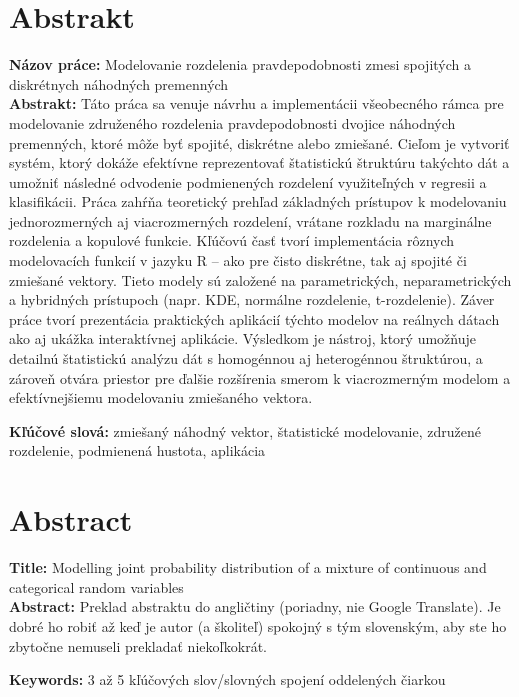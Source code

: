 
\section*{Abstrakt}

\noindent \textbf{Názov práce:} Modelovanie rozdelenia pravdepodobnosti zmesi spojitých a diskrétnych náhodných premenných\\
\textbf{Abstrakt:} Táto práca sa venuje návrhu a implementácii všeobecného rámca pre modelovanie združeného rozdelenia pravdepodobnosti dvojice náhodných premenných, ktoré môže byť spojité, diskrétne alebo zmiešané. Cieľom je vytvoriť systém, ktorý dokáže efektívne reprezentovať štatistickú štruktúru takýchto dát a umožniť následné odvodenie podmienených rozdelení využiteľných v regresii a klasifikácii. Práca zahŕňa teoretický prehľad základných prístupov k modelovaniu jednorozmerných aj viacrozmerných rozdelení, vrátane rozkladu na marginálne rozdelenia a kopulové funkcie. Kľúčovú časť tvorí implementácia rôznych modelovacích funkcií v jazyku R – ako pre čisto diskrétne, tak aj spojité či zmiešané vektory. Tieto modely sú založené na parametrických, neparametrických a hybridných prístupoch (napr. KDE, normálne rozdelenie, t-rozdelenie). Záver práce tvorí prezentácia praktických aplikácií týchto modelov na reálnych dátach ako aj ukážka interaktívnej aplikácie. Výsledkom je nástroj, ktorý umožňuje detailnú štatistickú analýzu dát s homogénnou aj heterogénnou štruktúrou, a zároveň otvára priestor pre ďalšie rozšírenia smerom k viacrozmerným modelom a efektívnejšiemu modelovaniu zmiešaného vektora.

\vspace{10pt}

\noindent \textbf{Kľúčové slová:} zmiešaný náhodný vektor, štatistické modelovanie, združené rozdelenie, podmienená hustota, aplikácia

\vspace{+20pt}


\section*{Abstract}
\noindent \textbf{Title:} Modelling joint probability distribution of a mixture of continuous and categorical random variables\\
\textbf{Abstract:} Preklad abstraktu do angličtiny (poriadny, nie Google Translate). Je dobré ho robiť až keď je autor (a školiteľ) spokojný s tým slovenským, aby ste ho zbytočne nemuseli prekladať niekoľkokrát.

\vspace{10pt}

\noindent \textbf{Keywords:} 3 až 5 kľúčových slov/slovných spojení oddelených čiarkou
